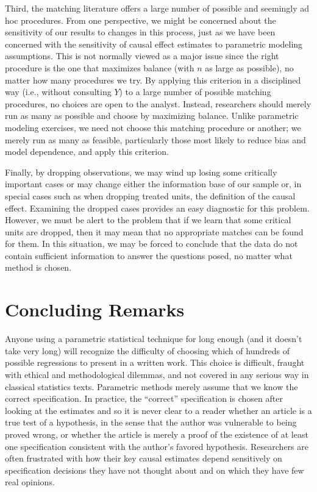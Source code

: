 \documentclass[11pt,titlepage]{article}
\begin{document}
Third, the matching literature offers a large number of possible and
seemingly ad hoc procedures.  From one perspective, we might be
concerned about the sensitivity of our results to changes in this
process, just as we have been concerned with the sensitivity of causal
effect estimates to parametric modeling assumptions.  This is not
normally viewed as a major issue since the right procedure is the one
that maximizes balance (with $n$ as large as possible), no matter how
many procedures we try.  By applying this criterion in a disciplined
way (i.e., without consulting $Y$) to a large number of possible
matching procedures, no choices are open to the analyst.  Instead,
researchers should merely run as many as possible and choose by
maximizing balance.  Unlike parametric modeling exercises, we need not
choose this matching procedure or another; we merely run as many as
feasible, particularly those most likely to reduce bias and model
dependence, and apply this criterion.

Finally, by dropping observations, we may wind up losing some
critically important cases or may change either the information base
of our sample or, in special cases such as when dropping treated
units, the definition of the causal effect.  Examining the dropped cases
provides an easy diagnostic for this problem.  However, we must be
alert to the problem that if we learn that some critical units are
dropped, then it may mean that no appropriate matches can be found for
them.  In this situation, we may be forced to conclude that the data
do not contain sufficient information to answer the questions posed,
no matter what method is chosen.

\section{Concluding Remarks}

Anyone using a parametric statistical technique for long enough (and
it doesn't take very long) will recognize the difficulty of choosing
which of hundreds of possible regressions to present in a written
work.  This choice is difficult, fraught with ethical and
methodological dilemmas, and not covered in any serious way in
classical statistics texts.  Parametric methods merely assume that we
know the correct specification.  In practice, the ``correct''
specification is chosen after looking at the estimates and so it is
never clear to a reader whether an article is a true test of a
hypothesis, in the sense that the author was vulnerable to being
proved wrong, or whether the article is merely a proof of the
existence of at least one specification consistent with the author's
favored hypothesis.  Researchers are often frustrated with how their
key causal estimates depend sensitively on specification decisions
they have not thought about and on which they have few real opinions.
\end{document}
